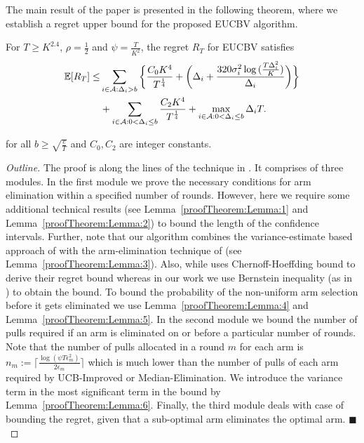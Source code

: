 The main result of the paper is presented in the following theorem, where we establish a regret upper bound for the proposed EUCBV  algorithm. 
\begin{theorem}
\label{Result:Theorem:1}
For $T\geq K^{2.4}$, $\rho=\frac{1}{2}$ and $\psi=\frac{T}{K^2}$, the regret $R_T$ for EUCBV satisfies
\begin{align*}
\mathbb{E} [R_{T}] \leq &\sum\limits_{i\in \mathcal{A} :\Delta_{i} > b}\bigg\lbrace \dfrac{C_0 K^{4}}{T^{\frac{1}{4}}} + \bigg(\Delta_{i}+\dfrac{320\sigma_i^2\log{(\frac{T\Delta_{i}^{2}}{K})}}{\Delta_{i}}\bigg)\bigg \rbrace\\ 
  & +\sum\limits_{i\in \mathcal{A} :0 < \Delta_{i}\leq b} \dfrac{C_2 K^{4}}{T^{\frac{1}{4}}} + \max_{i\in \mathcal{A} :0 < \Delta_{i}\leq b}\Delta_{i}T.
\end{align*}

for all $b\geq\sqrt{\frac{e}{T}}$ and $C_0, C_2$ are integer constants. 
\end{theorem}

\begin{proof}[Outline]
The proof is along the lines of the technique in \citet{auer2010ucb}. It comprises of three modules. In the first module we prove the necessary conditions for arm elimination within a specified number of rounds. However, here we require some additional technical results (see Lemma~\ref{proofTheorem:Lemma:1} and Lemma~\ref{proofTheorem:Lemma:2}) to bound the length of the confidence intervals. Further, note that our algorithm combines the variance-estimate based approach of \citet{audibert2009exploration} with the arm-elimination technique of \citet{auer2010ucb} (see Lemma~\ref{proofTheorem:Lemma:3}). Also, while \citet{auer2010ucb} uses Chernoff-Hoeffding bound to derive their regret bound whereas in our work we use  Bernstein inequality (as in \citet{audibert2009exploration}) to obtain the bound. To bound the probability of the non-uniform arm selection before it gets eliminated we use Lemma~\ref{proofTheorem:Lemma:4} and Lemma~\ref{proofTheorem:Lemma:5}. In the second module we bound the number of pulls required if an arm is eliminated on or before a particular number of rounds. Note that the number of pulls allocated in a round $m$ for each arm is $n_{m}:=\bigg\lceil\frac{\log{(\psi T\epsilon_{m}^{2})}}{2\epsilon_{m}}\bigg\rceil$ which is much lower than the number of pulls of each arm required by UCB-Improved or Median-Elimination. We introduce the variance term in the most significant term in the bound by Lemma~\ref{proofTheorem:Lemma:6}. Finally, the third module deals with case of bounding the regret, given that a sub-optimal arm eliminates the optimal arm.
\hfill $\blacksquare$
\end{proof}

